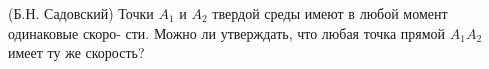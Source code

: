 (Б.Н. Садовский)
Точки $A_{1}$ и $A_{2}$ твердой среды имеют в любой момент одинаковые скоро-
сти. Можно ли утверждать, что любая точка прямой $A_{1}$$A_{2}$ имеет ту же скорость?
